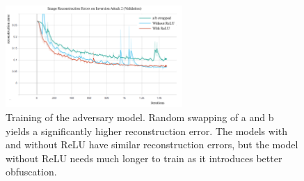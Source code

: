 \begin{figure}
    \centering
    \includegraphics[width=0.6\textwidth]{../openreview/images/diagram_training.png}
    \caption{Training of the adversary model. Random swapping of a and b yields a significantly higher reconstruction error. The models with and without ReLU have similar reconstruction errors, but the model without ReLU needs much longer to train as it introduces better obfuscation.}
    \label{fig:diagram_training}
\end{figure}



